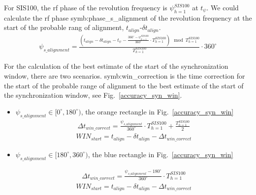 For SIS100, the rf phase of the revolution frequency is $\psi_{h=1}^{SIS100}$ at $t_{\psi}$. We could calculate the rf phase \gls{symb:phase_s_alignment} of the revolution frequency at the start of the probable rang of alignment, $t_\mathit{align}$-$\delta t_\mathit{align}$.
\begin{equation}
\begin{aligned}
\psi_{s\_alignment}=\frac{(t_\mathit{align}-\delta t_\mathit{align}-t_{\psi}- \frac{360^\circ-\psi_{h=1}^{SIS100}}{360^\circ} \cdot {T_{h=1}^{SIS100}}) \mod T_{h=1}^{SIS100}}{T_{h=1}^{SIS100}}\cdot {360^\circ} 
\label{phase_after_syn}
\end{aligned}
\end{equation}

For the calculation of the best estimate of the start of the synchronization window, there are two scenarios. \gls{symb:win_correction} is the time correction for the start of the probable range of alignment to the best estimate of the start of the synchronization  window, see Fig.~\ref{accuracy_syn_win}.
\begin{itemize}
\item $\psi_{s\_alignment}\in [0^\circ,180^\circ)$, the orange rectangle in Fig.~\ref{accuracy_syn_win}
\begin{equation}
\begin{aligned}
\Delta t_{win \_correct}=\frac{\psi_{s\_alignment}}{360^\circ}\cdot T_{h=1}^{SIS100}+\frac{T_{h=1}^{SIS100}}{2}
\end{aligned}
\end{equation}
\begin{equation}
\begin{aligned}
WIN_{start}= t_\mathit{align}- \delta t_\mathit{align}-\Delta t_{win \_correct}
\end{aligned}
\end{equation}


\item $\psi_{s\_alignment}\in [180^\circ,360^\circ)$, the blue rectangle in Fig.~\ref{accuracy_syn_win}

\begin{equation}
\begin{aligned}
\Delta t_{win \_correct}=\frac{\psi_{s\_alignment}-180^\circ}{360^\circ}\cdot T_{h=1}^{SIS100}
\end{aligned}
\end{equation}
\begin{equation}
\begin{aligned}
WIN_{start}= t_\mathit{align}- \delta t_\mathit{align}-\Delta t_{win \_correct}
\end{aligned}
\end{equation}

\end{itemize}


